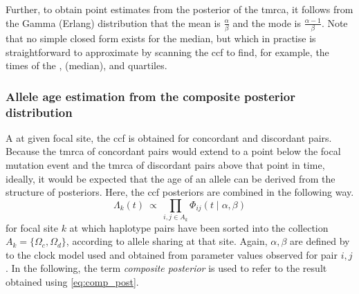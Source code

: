 Further, to obtain point estimates from the posterior of the \gls{tmrca},
it follows from the Gamma (Erlang) distribution that the mean is $\frac{\alpha}{\beta}$ and the mode is $\frac{\alpha-1}{\beta}$.
Note that no simple closed form exists for the median, but which in practise is straightforward to approximate by scanning the \gls{ccf} to find, for example, the times of the ,  (\ie median), and  quartiles.


%


%
\subsubsection{Allele age estimation from the composite posterior distribution}\label{sec:comp_post_detail}
%

A at given focal site, the \gls{ccf} is obtained for concordant and discordant pairs.
Because the \gls{tmrca} of concordant pairs would extend to a point below the focal mutation event and the \gls{tmrca} of discordant pairs above that point in time, ideally, it would be expected that the age of an allele can be derived from the structure of posteriors.
Here, the \gls{ccf} posteriors are combined in the following way.
\begin{equation}\label{eq:comp_post}
	\Lambda_k(t)~\propto~\prod_{i,j \in A_k} \Phi_{ij}(t\mid\alpha,\beta)
\end{equation}
for focal site $k$ at which haplotype pairs have been sorted into the collection ${A_k=\{\Omega_c,\Omega_d\}}$, according to allele sharing at that site.
Again, ${\alpha,\beta}$ are defined by to the clock model used and obtained from parameter values observed for pair ${i,j}$.
In the following, the term \emph{composite posterior} is used to refer to the result obtained using \cref{eq:comp_post}.

